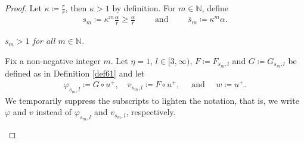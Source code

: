 \documentclass[11pt, a4paper]{article}
\numberwithin{equation}{section}
\newcommand{\NN}{{\mathbb N}}
\begin{document}
  \begin{proof} 
    Let $\kappa \coloneqq \frac{r}{\overline{r}}$, then $\kappa > 1$
    by definition. For $m \in \NN$, define
 \begin{align*}
   s_{m}\coloneqq \kappa^{m}\frac{\alpha}{\overline{r}}\ge
   \frac{\alpha}{\overline{r}}
   \qquad \text{ and } \qquad
   \overline{s}_{m}\coloneqq \kappa^{m}\alpha.
 \end{align*}
 \begin{description}[wide]
 \item[Case 1.] \emph{$s_m > 1$ for all $m \in \NN$.}
   
   Fix a non-negative integer $m$.  Let $\eta=1$, $l\in [3,\infty)$,
   $F \coloneqq F_{s_{m},l}$ and $G\coloneqq G_{s_{m},l}$ be defined
   as in Definition \ref{def61} and let
   \begin{align}
     \label{eq:5}
   \varphi_{s_m,l} \coloneqq G \circ u^+, \quad v_{s_m,l} \coloneqq F \circ u^+, \quad
     \text{ and }\quad w \coloneqq u^+.
   \end{align}
   We temporarily suppress the subscripts to lighten the notation,
   that is, we write $\varphi$ and $v$ instead of
   $\varphi_{s_m,l}$ and $v_{s_m,l}$, respectively.
   

\end{description}
\end{proof}
\end{document}
